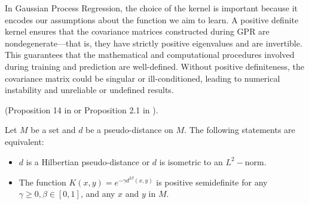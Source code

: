 
In Gaussian Process Regression, the choice of the kernel is important because it encodes our assumptions about the function we aim to learn. A positive definite kernel ensures that the covariance matrices constructed during GPR are nondegenerate—that is, they have strictly positive eigenvalues and are invertible. This guarantees that the mathematical and computational procedures involved during training and prediction are well-defined. Without positive definiteness, the covariance matrix could be singular or ill-conditioned, leading to numerical instability and unreliable or undefined results.





\begin{proposition}(Proposition 14 in \cite{meunier2022slicedw} or Proposition 2.1 in \cite{Haasdonk})\label{pos:pd_kernel}.

Let $ M$ be a set and $d$ be a pseudo-distance on $M$. The following statements are equivalent:
\begin{itemize}
    \item $d$ is a Hilbertian pseudo-distance or $d$ is isometric to an $L^2-$norm.
    \item The function $ K(x, y) = e^{-\gamma d^{2\beta}(x, y)} $ is positive semidefinite for any $ \gamma \geq 0 ,  \beta \in [0, 1] $, and any $x$ and $y$ in $M$.
\end{itemize}
\end{proposition}


